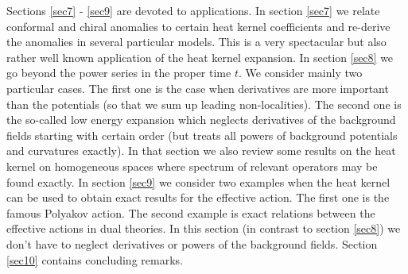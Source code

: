 Sections \ref{sec7} - \ref{sec9} are devoted to applications.
In section \ref{sec7} we relate conformal and chiral anomalies
to certain heat kernel coefficients and re-derive the anomalies
in several particular models. This is a very spectacular but also 
rather well known application of the heat kernel expansion.
In section \ref{sec8} we go beyond
the power series in the proper time $t$. We consider mainly two
particular cases. The first one is the case when derivatives are more important
than the potentials (so that we sum up leading non-localities).
The second one is the so-called low energy expansion which neglects
derivatives of the background fields starting with certain order
(but treats all powers of background potentials and curvatures 
exactly). In that section we also review some results on the heat
kernel on homogeneous spaces where spectrum of relevant operators
may be found exactly. In section \ref{sec9} we consider two examples
when the heat kernel can be used to obtain exact results for the
effective action. The first one is the famous Polyakov action.
The second example is exact relations between the effective actions
in dual theories. In this section (in contrast to section \ref{sec8})
we don't have to neglect derivatives or powers of
the background fields. Section \ref{sec10} contains concluding
remarks.


